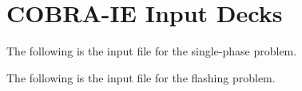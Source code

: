 \chapter{COBRA-IE Input Decks}
\label{app:input_decks}

The following is the \cobra{} input file for the single-phase problem.
\singlespace
{\small }

\pagebreak
The following is the \cobra{} input file for the flashing problem.
{\small }